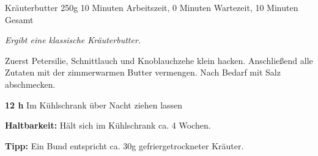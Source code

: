 \begin{recipe}{Kräuterbutter} {250g} {10 Minuten Arbeitszeit, 0 Minuten Wartezeit, 10 Minuten Gesamt}

  \freeform{}\textit{Ergibt eine klassische Kräuterbutter.}


  Zuerst Petersilie, Schnittlauch und Knoblauchzehe klein hacken.
  Anschließend alle Zutaten mit der zimmerwarmen Butter vermengen.
  Nach Bedarf mit Salz abschmecken.

  \newstep{}\textbf{12 h}
  Im Kühlschrank über Nacht ziehen lassen

  \freeform{}\hrulefill{}

  \freeform{}\textbf{Haltbarkeit:}
  Hält sich im Kühlschrank ca. 4 Wochen.

  \freeform{}\textbf{Tipp:}
  Ein Bund entspricht ca. 30g gefriergetrockneter Kräuter.

\end{recipe}
